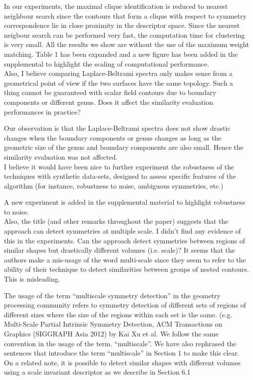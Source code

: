 \documentclass[10pt]{article}
\begin{document}
   {\color{blue}In our experiments, the maximal clique identification
	   is reduced to nearest neighbour search since the contours
	   that form a clique with respect to symmetry correspondence
	   lie in close proximity in the descriptor space. Since the 
	   nearest neigbour search can be performed very fast, the
	   computation time for clustering is very small. 
	   All the results we show are without the
	   use of the maximum weight matching. Table 1 
	   has been expanded and a new figure has been added in
	   the supplemental to highlight  the scaling of computational performance.}\\

   Also, I believe comparing Laplace-Beltrami spectra only makes sense from
   a geometrical point of view if the two surfaces have the same topology.
   Such a thing cannot be guaranteed with scalar field contours due to
   boundary components or different genus. Does it affect the similarity
   evaluation performances in practice?
	
   {\color{blue}Our observation is that the Laplace-Beltrami spectra
	   does not show drastic changes when the boundary components or genus changes
	   as long as the geometric size of the genus and boundary components 
   are also small. Hence the similarity evaluation was not affected.}\\

   I believe it would have been nice to further experiment the robustness of
   the techniques with synthetic data-sets, designed to assess specific
   features of the algorithm (for instance, robustness to noise, ambiguous
   symmetries, etc.)

   {\color{blue}A new experiment is added in the supplemental material
   to highlight robustness to noise.}\\

   Also, the title (and other remarks throughout the paper) suggests that
   the approach can detect symmetries at multiple scale. I didn't find any
   evidence of this in the experiments. Can the approach detect symmetries
   between regions of similar shapes but drastically different volumes (i.e.
   scale)?
   It seems that the authors make a mis-usage of the word multi-scale since
   they seem to refer to the ability of their technique to detect
   similarities between groups of nested contours. This is misleading.

   {\color{blue}The usage of the term ``multiscale symmetry detection'' in
	   the geometry processing community refers to symmetry detection of
	   different sets of regions of different sizes where the size of the regions
	   within each set is the same. (e.g. Multi-Scale Partial Intrinsic Symmetry Detection,
   ACM Transactions on Graphics (SIGGRAPH Asia 2012) by Kai Xu et al.
   We follow the same convention in the usage of the term. ``multiscale''.
   We have also rephrased the sentences that introduce the term ``multiscale''
   in Section 1 to make this clear. On a related note, it is possible to
   detect similar shapes with different volumes using a scale invariant descriptor  as we describe in Section 6.1}\\
   
\end{document}
